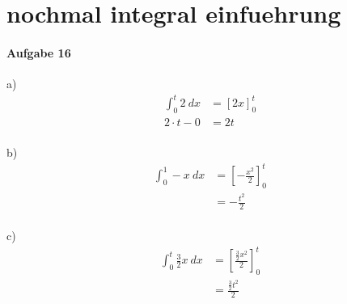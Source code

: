 
\section{nochmal integral einfuehrung}

\paragraph{Aufgabe 16}
a)
\begin{align*}
    \int_{0}^{t} 2 \ dx &= [2x]^t_0 \\ 
    2\cdot t-0&= 2t \\
\end{align*}

b)
\begin{align*}
    \int_{0}^{1} -x \ dx &= \left[  -\frac{x^2}{2}\right]_0^t   \\ 
    &= -\frac{t^2}{2} \\
\end{align*}

c)
\begin{align*}
    \int_{0}^{t} \frac{3}{2}x \ dx &= \left[  \frac{\frac{3}{2}x^2}{2}\right]_0^t  \\ 
        &= \frac{\frac{3}{2}t^2}{2} \\
\end{align*}




